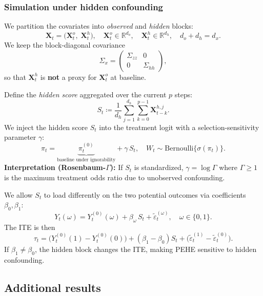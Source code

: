 \documentclass[10pt]{article} %
\begin{document}
\subsubsection{Simulation under hidden confounding}
\label{sect:ar_sim_description_sensitivity}

We partition the covariates into \emph{observed} and \emph{hidden} blocks:
\[
\mathbf{X}_t=\big(\mathbf{X}_t^o,\;\mathbf{X}_t^h\big),
\quad
\mathbf{X}_t^o\in\mathbb{R}^{d_o},\quad
\mathbf{X}_t^h\in\mathbb{R}^{d_h},\quad
d_o+d_h=d_x.
\]
We keep the block-diagonal covariance
\[
\Sigma_x=\begin{pmatrix}
\Sigma_{zz} & 0\\
0 & \Sigma_{hh}
\end{pmatrix},
\]
so that \(\mathbf{X}_t^h\) is \textbf{not} a proxy for \(\mathbf{X}_t^o\) at baseline.

Define the \emph{hidden score} aggregated over the current \(p\) steps:
\[
S_t \coloneqq \frac{1}{d_h}\sum_{j=1}^{d_h}\sum_{k=0}^{p-1} \mathbf{X}_{t-k}^{h, j}.
\]
We inject the hidden score \(S_t\) into the treatment logit with a selection-sensitivity parameter \(\gamma\):
\[
\pi_t
=\underbrace{\pi^{(0)}_t}_{\text{baseline under ignorability}}
+\gamma\,S_t,\quad W_t\sim \mathrm{Bernoulli}\{\sigma(\pi_t)\}.
\]
\textbf{Interpretation (Rosenbaum-\(\Gamma\)):} If \(S_t\) is standardized, \(\gamma=\log\Gamma\) where \(\Gamma\ge 1\) is the maximum treatment odds ratio due to unobserved confounding.

We allow \(S_t\) to load differently on the two potential outcomes via coefficients \(\beta_0,\beta_1\):
\[
Y_t(\omega) = Y_t^{(0)}(\omega) + \beta_\omega\, S_t + \tilde{\varepsilon}_t^{(\omega)},\quad \omega\in\{0,1\}.
\]
The ITE is then
\[
\tau_t = \big(Y_t^{(0)}(1)-Y_t^{(0)}(0)\big) + (\beta_1-\beta_0)S_t + \big(\tilde{\varepsilon}_t^{(1)}-\tilde{\varepsilon}_t^{(0)}\big).
\]
If \(\beta_1\neq\beta_0\), the hidden block changes the ITE, making PEHE sensitive to hidden confounding.


\subsection{Additional results}
\label{appendix:arsim_extended_results}
\end{document}
